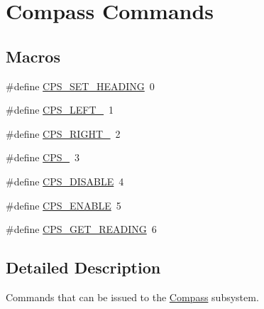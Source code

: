 \hypertarget{group__compass__commands}{\section{Compass Commands}
\label{group__compass__commands}
}
\subsection*{Macros}
\begin{DoxyCompactItemize}
\item 
\#define \hyperlink{group__compass__commands_ga10dbf50964cb04b6648e3b65502c0ff4}{C\-P\-S\-\_\-\-S\-E\-T\-\_\-\-H\-E\-A\-D\-I\-N\-G}~0
\item 
\#define \hyperlink{group__compass__commands_gab51c4d4e21701c7cd0230a24c2ab74be}{C\-P\-S\-\_\-\-L\-E\-F\-T\-\_}~1
\item 
\#define \hyperlink{group__compass__commands_ga53ccdcb9ce75af6b95e56476367d2875}{C\-P\-S\-\_\-\-R\-I\-G\-H\-T\-\_}~2
\item 
\#define \hyperlink{group__compass__commands_gafb06fe5e8531750fd730129beb1c85a9}{C\-P\-S\-\_}~3
\item 
\#define \hyperlink{group__compass__commands_gacc391ac5638a636771f016cfa1991d4d}{C\-P\-S\-\_\-\-D\-I\-S\-A\-B\-L\-E}~4
\item 
\#define \hyperlink{group__compass__commands_ga7991975b6f6c2c5c731bafe810ebcab8}{C\-P\-S\-\_\-\-E\-N\-A\-B\-L\-E}~5
\item 
\#define \hyperlink{group__compass__commands_ga5804a250179671cacf4c9b1b4572d8de}{C\-P\-S\-\_\-\-G\-E\-T\-\_\-\-R\-E\-A\-D\-I\-N\-G}~6
\end{DoxyCompactItemize}


\subsection{Detailed Description}
Commands that can be issued to the \hyperlink{classCompass}{Compass} subsystem. 

